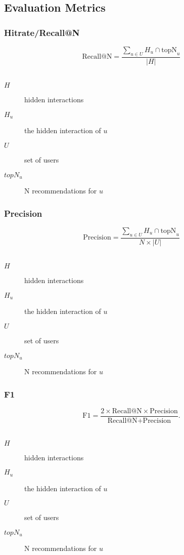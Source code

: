 \documentclass{beamer}
\begin{document}
\subsection{Evaluation Metrics}
\begin{frame} 
\frametitle{Hitrate/Recall@N~\cite{Karypis:2001:EIT:502585.502627, Sarwar00applicationof}}
\begin{equation} 
\text{Recall@N}=\frac{\sum_{u \in U} H_u \cap \text{topN}_u}{|H|}
\end{equation}\\
\vspace{6.4mm}
\begin{description}
    \item[$H$] hidden interactions\\
    \item[$H_u$] the hidden interaction of $u$\\
    \item[$U$] set of users
    \item[$topN_u$] N recommendations for $u$
\end{description}
\end{frame}

\begin{frame} 
\frametitle{Precision~\cite{Sarwar00applicationof}}
\begin{equation} 
\text{Precision}=\frac{\sum_{u \in U} H_u \cap \text{topN}_u}{N \times |U|}
\end{equation}\\
\vspace{6.4mm}
\begin{description}
    \item[$H$] hidden interactions\\
    \item[$H_u$] the hidden interaction of $u$\\
    \item[$U$] set of users
    \item[$topN_u$] N recommendations for $u$
\end{description}
\end{frame}

\begin{frame} 
    \frametitle{F1~\cite{Sarwar00applicationof}}
\begin{equation} 
\text{F1}=\frac{2 \times \text{Recall@N} \times 
\text{Precision}}{\text{Recall@N} + \text{Precision}}.
\end{equation}\\
\vspace{6.4mm}
\begin{description}
    \item[$H$] hidden interactions\\
    \item[$H_u$] the hidden interaction of $u$\\
    \item[$U$] set of users
    \item[$topN_u$] N recommendations for $u$
\end{description}
\end{frame}
\end{document}
